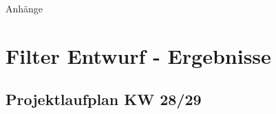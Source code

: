 %
%
%
\begin{appendix}

\newpage

\begin{center}
	\huge{Anhänge}
\end{center}

\normalsize

\section{Filter Entwurf - Ergebnisse}
\label{FirFilterResult}


\newpage
\begin{landscape}
	\section{Projektlaufplan KW 28/29}
	\label{sec:projectplan}
	\scalebox{.75}{
		
		}
\end{landscape}


\end{appendix}
